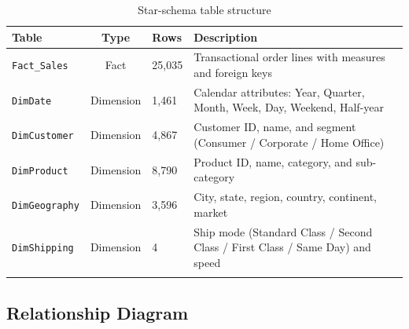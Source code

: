 \documentclass[11pt,a4paper]{article}
\begin{document}
\begin{longtable}{lclp{5.5cm}}
\toprule
\textbf{Table} & \textbf{Type} & \textbf{Rows} & \textbf{Description} \\
\midrule
\endhead
\texttt{Fact\_Sales} & Fact & 25,035 & Transactional order lines with measures and foreign keys\\
\texttt{DimDate} & Dimension & 1,461 & Calendar attributes: Year, Quarter, Month, Week, Day, Weekend, Half-year\\
\texttt{DimCustomer} & Dimension & 4,867 & Customer ID, name, and segment (Consumer / Corporate / Home Office)\\
\texttt{DimProduct} & Dimension & 8,790 & Product ID, name, category, and sub-category\\
\texttt{DimGeography} & Dimension & 3,596 & City, state, region, country, continent, market\\
\texttt{DimShipping} & Dimension & 4 & Ship mode (Standard Class / Second Class / First Class / Same Day) and speed\\
\bottomrule
\caption{Star-schema table structure}
\end{longtable}

\subsection{Relationship Diagram}
\end{document}
